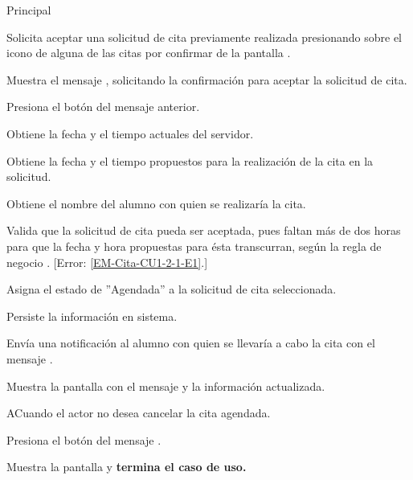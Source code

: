 \begin{UCtrayectoria}{Principal}

	\UCpaso [\UCactor] Solicita aceptar una solicitud de cita previamente realizada presionando sobre el icono  de alguna de las citas por confirmar de la pantalla .

	\UCpaso Muestra el mensaje , solicitando la confirmación para aceptar la solicitud de cita. 

	\UCpaso Presiona el botón  del mensaje anterior.  
 
	\UCpaso Obtiene la fecha y el tiempo actuales del servidor.

	\UCpaso Obtiene la fecha y el tiempo propuestos para la realización de la cita en la solicitud.

	\UCpaso Obtiene el nombre del alumno con quien se realizaría la cita. 

	\UCpaso Valida que la solicitud de cita pueda ser aceptada, pues faltan más de dos horas para que la fecha y hora propuestas para ésta transcurran, según la regla de negocio . [Error: \ref{EM-Cita-CU1-2-1-E1}.] 

	\UCpaso Asigna el estado de ''Agendada'' a la solicitud de cita seleccionada. 

	\UCpaso Persiste la información en sistema. 

	\UCpaso Envía una notificación al alumno con quien se llevaría a cabo la cita con el mensaje .

	\UCpaso Muestra la pantalla  con el mensaje  y la información actualizada.
	

\end{UCtrayectoria}

\begin{UCtrayectoriaA}{A}{Cuando el actor no desea cancelar la cita agendada.}

	\UCpaso Presiona el botón  del mensaje .

	\UCpaso Muestra la pantalla  y \textbf{termina el caso de uso.}

\end{UCtrayectoriaA}
